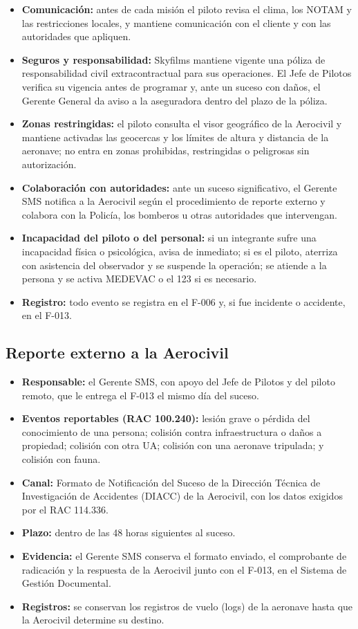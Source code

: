 \begin{itemize}
\item \textbf{Comunicación:} antes de cada misión el piloto revisa el clima, los NOTAM y las restricciones locales, y mantiene comunicación con el cliente y con las autoridades que apliquen.
\item \textbf{Seguros y responsabilidad:} Skyfilms mantiene vigente una póliza de responsabilidad civil extracontractual para sus operaciones. El Jefe de Pilotos verifica su vigencia antes de programar y, ante un suceso con daños, el Gerente General da aviso a la aseguradora dentro del plazo de la póliza.
\item \textbf{Zonas restringidas:} el piloto consulta el visor geográfico de la Aerocivil y mantiene activadas las geocercas y los límites de altura y distancia de la aeronave; no entra en zonas prohibidas, restringidas o peligrosas sin autorización.
\item \textbf{Colaboración con autoridades:} ante un suceso significativo, el Gerente SMS notifica a la Aerocivil según el procedimiento de reporte externo y colabora con la Policía, los bomberos u otras autoridades que intervengan.
\item \textbf{Incapacidad del piloto o del personal:} si un integrante sufre una incapacidad física o psicológica, avisa de inmediato; si es el piloto, aterriza con asistencia del observador y se suspende la operación; se atiende a la persona y se activa MEDEVAC o el 123 si es necesario.
\item \textbf{Registro:} todo evento se registra en el F-006 y, si fue incidente o accidente, en el F-013.
\end{itemize}

\subsection{Reporte externo a la Aerocivil}

\begin{itemize}
\item \textbf{Responsable:} el Gerente SMS, con apoyo del Jefe de Pilotos y del piloto remoto, que le entrega el F-013 el mismo día del suceso.
\item \textbf{Eventos reportables (RAC 100.240):} lesión grave o pérdida del conocimiento de una persona; colisión contra infraestructura o daños a propiedad; colisión con otra UA; colisión con una aeronave tripulada; y colisión con fauna.
\item \textbf{Canal:} Formato de Notificación del Suceso de la Dirección Técnica de Investigación de Accidentes (DIACC) de la Aerocivil, con los datos exigidos por el RAC 114.336.
\item \textbf{Plazo:} dentro de las 48 horas siguientes al suceso.
\item \textbf{Evidencia:} el Gerente SMS conserva el formato enviado, el comprobante de radicación y la respuesta de la Aerocivil junto con el F-013, en el Sistema de Gestión Documental.
\item \textbf{Registros:} se conservan los registros de vuelo (logs) de la aeronave hasta que la Aerocivil determine su destino.
\end{itemize}

